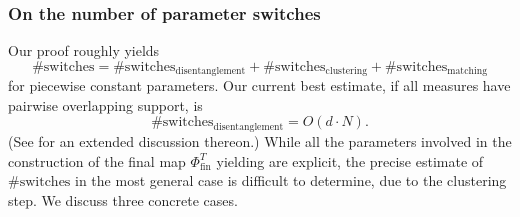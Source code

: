 \documentclass[a4paper,11pt]{article}
\theoremstyle{plain}
\numberwithin{equation}{section}
\begin{document}
\subsubsection{On the number of parameter switches} \label{sec: nb.disc}

Our proof roughly yields
\begin{equation*}
    \#\text{switches} =  \#\text{switches}_{\text{disentanglement}} + \#\text{switches}_{\text{clustering}} + \#\text{switches}_{\text{matching}}
\end{equation*}
for piecewise constant parameters. Our current best estimate, if all measures have pairwise overlapping support, is 
\begin{equation*}
 \#\text{switches}_{\text{disentanglement}} = O(d \cdot N).   
\end{equation*}
(See {\bf {}} for an extended discussion thereon.)
While all the parameters involved in the construction of the final map $\Phi_{\text{fin}}^T$ yielding  are explicit, the precise estimate of $\#\text{switches}$ in the most general case is difficult to determine, due to the clustering step. We discuss three concrete cases.
\end{document}

